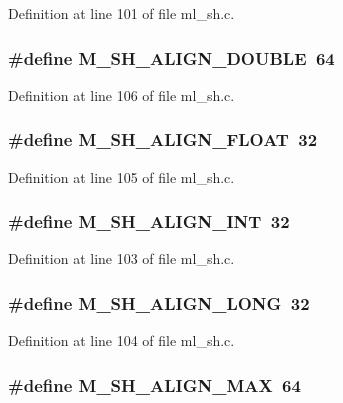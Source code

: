 Definition at line 101 of file ml\_\-sh.c.
\subsubsection{\setlength{\rightskip}{0pt plus 5cm}\#define M\_\-SH\_\-ALIGN\_\-DOUBLE~64}\label{ml__sh_8c_60953e49baa79004e5bb60abd25ddafe}




Definition at line 106 of file ml\_\-sh.c.
\subsubsection{\setlength{\rightskip}{0pt plus 5cm}\#define M\_\-SH\_\-ALIGN\_\-FLOAT~32}\label{ml__sh_8c_287c4fcf703477d667fa674c928a87d3}




Definition at line 105 of file ml\_\-sh.c.
\subsubsection{\setlength{\rightskip}{0pt plus 5cm}\#define M\_\-SH\_\-ALIGN\_\-INT~32}\label{ml__sh_8c_ea3738b9e691c593029340d04d6ef82d}




Definition at line 103 of file ml\_\-sh.c.
\subsubsection{\setlength{\rightskip}{0pt plus 5cm}\#define M\_\-SH\_\-ALIGN\_\-LONG~32}\label{ml__sh_8c_37f10235f78448be301019a167a45bbf}




Definition at line 104 of file ml\_\-sh.c.
\subsubsection{\setlength{\rightskip}{0pt plus 5cm}\#define M\_\-SH\_\-ALIGN\_\-MAX~64}\label{ml__sh_8c_4e881268fa91db34b855fb03219a4576}





